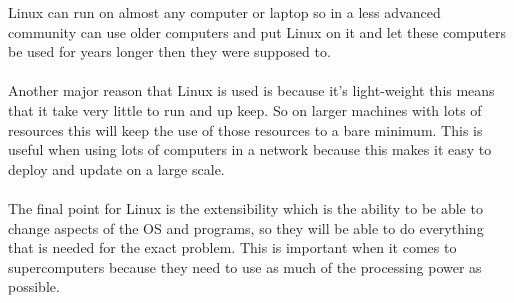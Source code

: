 \documentclass{article}
\begin{document}
Linux can run on almost any computer or laptop so in a less advanced community can use older computers and put Linux on it and let these computers be used for years longer then they were supposed to. 
\\ \\
Another major reason that Linux is used is because it's light-weight this means that it take very little to run and up keep.
So on larger machines with lots of resources this will keep the use of those resources to a bare minimum.
This is useful when using lots of computers in a network because this makes it easy to deploy and update on a large scale. 
\\ \\
The final point for Linux is the extensibility which is the ability to be able to change aspects of the OS and programs, so they will be able to do everything that is needed for the exact problem.
This is important when it comes to supercomputers because they need to use as much of the processing power as possible. 
\end{document}
